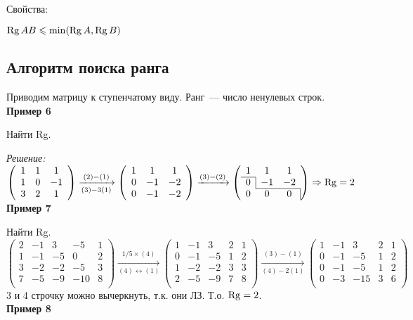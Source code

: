 Свойства:

$\operatorname{\mathop{Rg}} AB \leqslant \min(\operatorname{\mathop{Rg}} A, \operatorname{\mathop{Rg}} B)$

\subsection{Алгоритм поиска ранга}
Приводим матрицу к ступенчатому виду. Ранг~--- число ненулевых строк.\\
\textbf{Пример 6}

Найти Rg.

\noindent\textit{Решение:}\\[3mm]
$
\left( \begin{array}{ccc}
	1 & 1 & 1\\
	1 & 0 & -1\\
	3 & 2 & 1\\
\end{array} \right)
\xrightarrow[(3)-3(1)]{(2)-(1)}
\left( \begin{array}{ccc}
1 & 1 & 1\\
0 & -1 & -2\\
0 & -1 & -2\\
\end{array} \right)
\xrightarrow{(3)-(2)}
\left( \begin{array}{ccc}
1 & 1 & 1\\ \cline{1-1}
0 & \multicolumn{1}{|c}{-1} & -2\\ \cline{2-3}
0 & 0 & \multicolumn{1}{c|}{0}\\
\end{array} \right) \Rightarrow \Rg =2
$\vspace{3mm}\\
\textbf{Пример 7}

Найти Rg.\vspace{3mm}\\
$
\left( \begin{array}{ccccc}
2 & -1 & 3 & -5 & 1\\
1 & -1 & -5 & 0 & 2\\
3 & -2 & -2 & -5 & 3\\
7 & -5 & -9 & -10 & 8\\
\end{array} \right)
\xrightarrow[(4)\leftrightarrow(1)]{1/5\times(4)}
\left( \begin{array}{ccccc}
1 & -1 & 3 & 2 & 1\\
0 & -1 & -5 & 1 & 2\\
1 & -2 & -2 & 3 & 3\\
2 & -5 & -9 & 7 & 8\\
\end{array} \right)
\xrightarrow[(4)-2(1)]{(3)-(1)}
\left( \begin{array}{ccccc}
1 & -1 & 3 & 2 & 1\\
0 & -1 & -5 & 1 & 2\\
0 & -1 & -5 & 1 & 2\\
0 & -3 & -15 & 3 & 6\\
\end{array} \right)
$\vspace{3mm}\\
3 и 4 строчку можно вычеркнуть, т.к. они ЛЗ. Т.о. $\operatorname{\mathop{Rg}}=2$.\\
\textbf{Пример 8}

